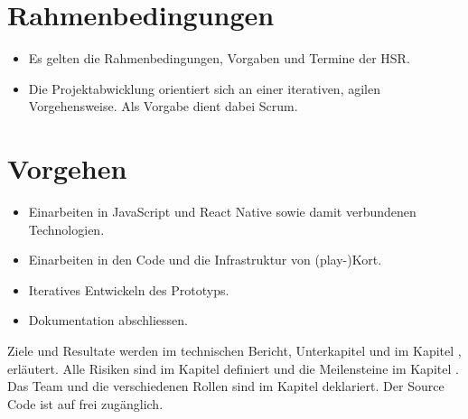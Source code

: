 \section{Rahmenbedingungen}
\begin{itemize}
	\item Es gelten die Rahmenbedingungen, Vorgaben und Termine der HSR.
	\item Die Projektabwicklung orientiert sich an einer iterativen, agilen Vorgehensweise. Als Vorgabe dient dabei Scrum.
\end{itemize}


\section{Vorgehen}
\begin{itemize}
	\item Einarbeiten in JavaScript und React Native sowie damit verbundenen Technologien.
	\item Einarbeiten in den Code und die Infrastruktur von (play-)Kort.
	\item Iteratives Entwickeln des Prototyps.
	\item Dokumentation abschliessen.
\end{itemize}

Ziele und Resultate werden im technischen Bericht, Unterkapitel  und im Kapitel , erläutert.
Alle Risiken sind im Kapitel  definiert und die Meilensteine im Kapitel .
Das Team und die verschiedenen Rollen sind im Kapitel  deklariert.
Der Source Code ist auf  frei zugänglich.

